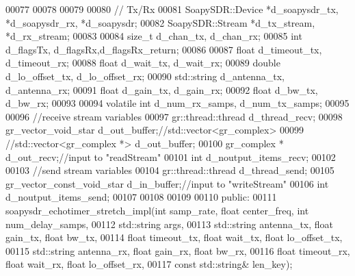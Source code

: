 \begin{DoxyCode}
00077 
00078 
00079 
00080          \textcolor{comment}{// Tx/Rx}
00081          SoapySDR::Device *d_soapysdr_tx, *d_soapysdr_rx, *d_soapysdr;
00082          SoapySDR::Stream *d_tx_stream, *d_rx_stream;
00083 
00084          \textcolor{keywordtype}{size\_t} d_chan_tx, d_chan_rx;
00085          \textcolor{keywordtype}{int} d_flagsTx, d_flagsRx,d_flagsRx_return;
00086 
00087          \textcolor{keywordtype}{float} d_timeout_tx, d_timeout_rx;
00088          \textcolor{keywordtype}{float} d_wait_tx, d_wait_rx;
00089          \textcolor{keywordtype}{double} d_lo_offset_tx, d_lo_offset_rx;
00090          std::string d_antenna_tx, d_antenna_rx;
00091          \textcolor{keywordtype}{float} d_gain_tx, d_gain_rx;
00092          \textcolor{keywordtype}{float} d_bw_tx, d_bw_rx;
00093 
00094          \textcolor{keyword}{volatile} \textcolor{keywordtype}{int} d_num_rx_samps, d_num_tx_samps;
00095 
00096          \textcolor{comment}{//receive stream variables}
00097          gr::thread::thread d_thread_recv;
00098          gr\_vector\_void\_star d_out_buffer;\textcolor{comment}{//std::vector<gr\_complex>}
00099          \textcolor{comment}{//std::vector<gr\_complex *> d\_out\_buffer;}
00100          gr\_complex *  d_out_recv;\textcolor{comment}{//input to "readStream"}
00101          \textcolor{keywordtype}{int} d_noutput_items_recv;
00102 
00103          \textcolor{comment}{//send stream variables}
00104          gr::thread::thread d_thread_send;
00105          gr\_vector\_const\_void\_star d_in_buffer;\textcolor{comment}{//input to "writeStream"}
00106          \textcolor{keywordtype}{int} d_noutput_items_send;
00107 
00108 
00109 
00110      \textcolor{keyword}{public}:
00111       soapysdr_echotimer_stretch_impl(\textcolor{keywordtype}{int} samp_rate, \textcolor{keywordtype}{float} center_freq, \textcolor{keywordtype}{int} 
      num_delay_samps,
00112                                         std::string args,
00113                                         std::string antenna\_tx, \textcolor{keywordtype}{float} gain\_tx, \textcolor{keywordtype}{float} bw\_tx,
00114                                         \textcolor{keywordtype}{float} timeout\_tx, \textcolor{keywordtype}{float} wait_tx, \textcolor{keywordtype}{float} lo\_offset\_tx,
00115                                         std::string antenna\_rx, \textcolor{keywordtype}{float} gain\_rx, \textcolor{keywordtype}{float} bw\_rx,
00116                                         \textcolor{keywordtype}{float} timeout\_rx, \textcolor{keywordtype}{float} wait_rx, \textcolor{keywordtype}{float} lo\_offset\_rx,
00117                                         \textcolor{keyword}{const} std::string& len\_key);

\end{DoxyCode}
